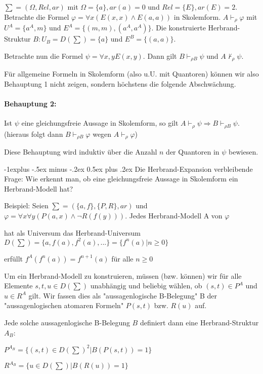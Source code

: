 \documentclass[a4paper]{article}
\makeatletter
\renewcommand{\subsection}{\@startsection{subsection}{2}{0mm}%
                {-1explus -.5ex minus -.2ex}%
                {0.5ex plus .2ex}%
                {\normalfont\normalsize\bfseries}}
\makeatother
\begin{document}
\begin{multicols}{3}
  $\sum = (\Omega,Rel,ar)$ mit $\Omega =\{a\},ar(a) =0$ und $Rel=\{E\},ar(E) =2$.
  Betrachte die Formel $\varphi=\forall x(E(x,x)\wedge E(a,a))$ in Skolemform.
  $A\vdash_\rho \varphi$ mit $U^A=\{a^A,m\}$ und $E^A=\{(m,m),(a^A,a^A)\}$.
  Die konstruierte Herbrand-Struktur $B:U_B=D(\sum) =\{a\}$ und $E^B=\{(a,a)\}$.

  Betrachte nun die Formel $\psi=\forall x,y E(x,y)$. Dann gilt $B\vdash_{\rho B}\psi$ und $A\not\vdash_\rho \psi$.

  Für allgemeine Formeln in Skolemform (also u.U. mit Quantoren) können wir also Behauptung 1 nicht zeigen, sondern höchstens die folgende Abschwächung.

  \paragraph{Behauptung 2:}
  Ist $\psi$ eine gleichungsfreie Aussage in Skolemform, so gilt $A\vdash_\rho \psi \Rightarrow B\vdash_{\rho B}\psi$.
  (hieraus folgt dann $B\vdash_{\rho B}\varphi$ wegen $A\vdash_\rho \varphi$)

  Diese Behauptung wird induktiv über die Anzahl $n$ der Quantoren in $\psi$ bewiesen.

  \subsection{Die Herbrand-Expansion}
  verbleibende Frage: Wie erkennt man, ob eine gleichungsfreie Aussage in Skolemform ein Herbrand-Modell hat?

  Beispiel: Seien $\sum=(\{a,f\},\{P,R\},ar)$ und $\varphi=\forall x\forall y (P(a,x)\wedge\lnot R(f(y)))$.
  Jedes Herbrand-Modell A von $\varphi$
  \begin{itemize*}
    \item hat als Universum das Herbrand-Universum $D(\sum)=\{a,f(a),f^2 (a),...\}=\{f^n(a)|n\geq 0\}$
    \item erfüllt $f^A(f^n(a))= f^{n+1} (a)$ für alle $n\geq 0$
  \end{itemize*}

  Um ein Herbrand-Modell zu konstruieren, müssen (bzw. können) wir für alle Elemente $s,t,u\in D(\sum)$ unabhängig und beliebig wählen, ob $(s,t)\in P^A$ und $u\in R^A$ gilt.
  Wir fassen dies als "aussagenlogische B-Belegung" B der "aussagenlogischen atomaren Formeln" $P(s,t)$ bzw. $R(u)$ auf.

  Jede solche aussagenlogische B-Belegung $B$ definiert dann eine Herbrand-Struktur $A_B$:
  \begin{itemize*}
    \item $P^{A_B} = \{(s,t)\in D(\sum)^2 |B(P(s,t))= 1\}$
    \item $R^{A_B} = \{u\in D(\sum) |B(R(u))= 1\}$
  \end{itemize*}


\end{multicols}
\end{document}

